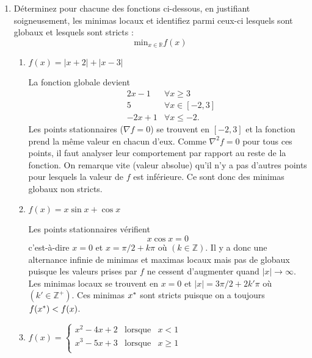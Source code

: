 \begin{enumerate}
  \item Déterminez pour chacune des fonctions ci-dessous,
  en justifiant soigneusement, les minimas locaux
  et identifiez parmi ceux-ci lesquels sont globaux 
  et lesquels sont stricts :
  \[ \text{min}_{x \in \mathbb{R}} f(x) \]
  
  \begin{enumerate}
    \item $f(x) = |x+2| + |x-3|$
      \begin{solution}
        La fonction globale devient
        \begin{align*}
          &2x-1& \forall x \geq 3 \\
          &5& \forall x \in [-2,3] \\
          &-2x+1& \forall x \leq -2.
        \end{align*}
        Les points stationnaires ($\nabla f = 0$) se trouvent en $[-2,3]$
        et la fonction prend la même valeur en chacun d'eux.
        Comme $\nabla^2 f=0$ pour tous ces points,
        il faut analyser leur comportement par rapport au reste de la fonction.
        On remarque vite (valeur absolue) 
        qu'il n'y a pas d'autres points pour lesquels
        la valeur de $f$ est inférieure.
        Ce sont donc des minimas globaux non stricts.
      \end{solution}
      
    \item $f(x) = x\sin{x} + \cos{x}$
      \begin{solution}
        Les points stationnaires vérifient
        \[x\cos{x} = 0\]
        c'est-à-dire $x=0$
        et $x= \pi/2 + k\pi$ où $(k\in\mathbb{Z})$.
        Il y a donc une alternance infinie de minimas et maximas locaux
        mais pas de globaux puisque les valeurs prises par $f$ ne cessent
        d'augmenter quand $|x| \rightarrow \infty$.
        Les minimas locaux se trouvent en $x=0$ 
        et $|x|= 3\pi/2 + 2k'\pi$ où $(k'\in\mathbb{Z}^+)$.
        Ces minimas $x^*$ sont stricts 
        puisque on a toujours $f(x^*) < f(x)$.
      \end{solution}
    \item 
    $f(x) = \left\{ \begin{array}{rcl}
             x^2-4x+2 & \mbox{lorsque} & x<1 \\ 
             x^3-5x+3 & \mbox{lorsque} & x \geq 1 \\
              \end{array}\right.$
    

\end{enumerate}
\end{enumerate}
